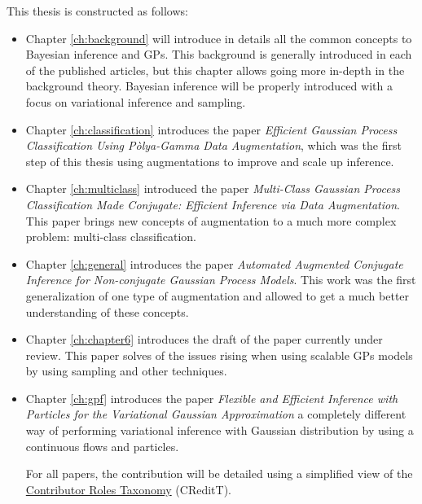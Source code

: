 This thesis is constructed as follows:
\begin{itemize}
    \item Chapter \ref{ch:background} will introduce in details all the common concepts to Bayesian inference and \ac{GPs}.
          This background is generally introduced in each of the published articles, but this chapter allows going more in-depth in the background theory.
          Bayesian inference will be properly introduced with a focus on variational inference and sampling.
    \item Chapter \ref{ch:classification} introduces the paper \textit{Efficient Gaussian Process Classification Using P\`olya-Gamma Data Augmentation}, which was the first step of this thesis using augmentations to improve and scale up inference.
    \item Chapter \ref{ch:multiclass} introduced the paper \textit{Multi-Class Gaussian Process Classification Made Conjugate: Efficient Inference via Data Augmentation}.
          This paper brings new concepts of augmentation to a much more complex problem: multi-class classification.
    \item Chapter \ref{ch:general} introduces the paper \textit{Automated Augmented Conjugate Inference for Non-conjugate Gaussian Process Models}.
          This work was the first generalization of one type of augmentation and allowed to get a much better understanding of these concepts.
    \item Chapter \ref{ch:chapter6} introduces the draft of the paper \textit{}
    currently under review.
    This paper solves of the issues rising when using scalable \ac{GPs} models by using sampling and other techniques.
    \item Chapter \ref{ch:gpf} introduces the paper \textit{Flexible and Efficient Inference with Particles for the Variational Gaussian Approximation } a completely different way of performing variational inference with Gaussian distribution by using a continuous flows and particles.
    
    For all papers, the contribution will be detailed using a simplified view of the \href{https://mdpi-res.com/data/contributor-role-instruction.pdf}{Contributor Roles Taxonomy} (CReditT).

\end{itemize}

